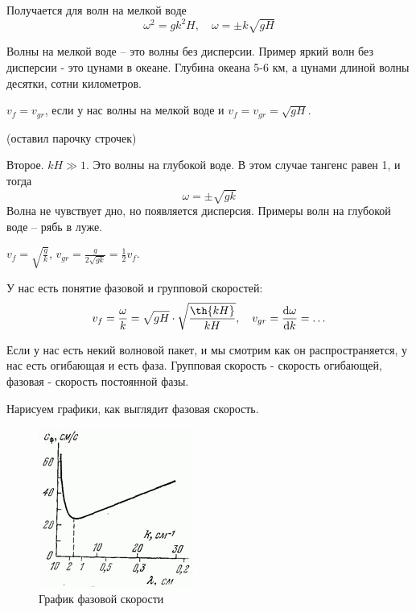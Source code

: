 Получается для волн на мелкой воде
\begin{equation}
	\omega^2=gk^2H, \quad \omega=\pm k\sqrt{gH}
\end{equation}

Волны на мелкой воде -- это волны без дисперсии. Пример яркий волн без дисперсии - это цунами в океане. Глубина океана 5-6 км, а цунами длиной волны десятки, сотни километров.

$v_f=v_{gr}$, если у нас волны на мелкой воде и $v_f=v_{gr}=\sqrt{gH}$.

(оставил парочку строчек)

Второе. $kH \gg 1$. Это волны на глубокой воде. В этом случае тангенс равен 1, и тогда
\begin{equation}
	\omega=\pm\sqrt{gk}
\end{equation}
Волна не чувствует дно, но появляется дисперсия. Примеры волн на глубокой воде -- рябь в луже.

$v_f=\sqrt{\frac{g}{k}}$, $v_{gr}=\frac{g}{2\sqrt{gk}}=\frac12 v_f$.

У нас есть понятие фазовой и групповой скоростей:
\begin{equation}
	v_f=\frac{\omega}{k}=\sqrt{gH}\cdot\sqrt{\frac{\th{kH}}{kH}}, \quad
	v_{gr}=\dv{\omega}{k}=\ldots
\end{equation}

Если у нас есть некий волновой пакет, и мы смотрим как он распространяется, у нас есть огибающая и есть фаза. Групповая скорость - скорость огибающей, фазовая - скорость постоянной фазы.

Нарисуем графики, как выглядит фазовая скорость.

\begin{figure}[H]
    \centering
    \includegraphics[scale=1.2]{photo/vf.jpg}
    \caption{График фазовой скорости}
    \label{fig:vph}
\end{figure}

